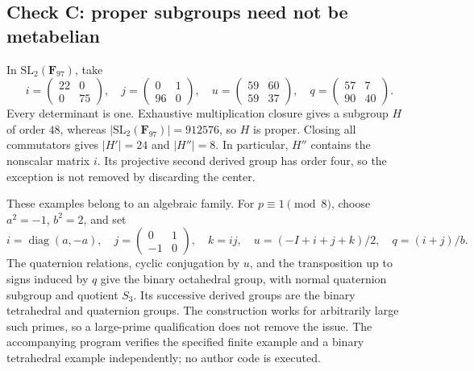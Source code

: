 \documentclass[10pt]{article}
\begin{document}
\subsection*{Check C: proper subgroups need not be metabelian}
In \(\mathrm{SL}_2(\mathbf F_{97})\), take \[i=\begin{pmatrix}22&0\\0&75\end{pmatrix},\quad
 j=\begin{pmatrix}0&1\\96&0\end{pmatrix},\quad
 u=\begin{pmatrix}59&60\\59&37\end{pmatrix},\quad
 q=\begin{pmatrix}57&7\\90&40\end{pmatrix}.\] Every determinant is one. Exhaustive multiplication closure gives a subgroup \(H\) of order \(48\), whereas \(|\mathrm{SL}_2(\mathbf F_{97})|=912576\), so \(H\) is proper. Closing all commutators gives \(|H'|=24\) and \(|H''|=8\). In particular, \(H''\) contains the nonscalar matrix \(i\). Its projective second derived group has order four, so the exception is not removed by discarding the center.\par
These examples belong to an algebraic family. For \(p\equiv1\pmod8\), choose \(a^2=-1\), \(b^2=2\), and set \[i=\operatorname{diag}(a,-a),\quad
 j=\begin{pmatrix}0&1\\-1&0\end{pmatrix},\quad
 k=ij,\quad u=(-I+i+j+k)/2,\quad q=(i+j)/b.\] The quaternion relations, cyclic conjugation by \(u\), and the transposition up to signs induced by \(q\) give the binary octahedral group, with normal quaternion subgroup and quotient \(S_3\). Its successive derived groups are the binary tetrahedral and quaternion groups. The construction works for arbitrarily large such primes, so a large-prime qualification does not remove the issue. The accompanying program verifies the specified finite example and a binary tetrahedral example independently; no author code is executed.\par
\end{document}
